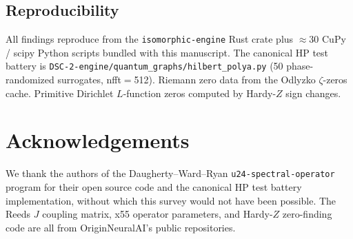 \documentclass[11pt,a4paper]{article}
\begin{document}
\subsection{Reproducibility}

All findings reproduce from the \texttt{isomorphic-engine} Rust crate
plus $\approx 30$ CuPy / scipy Python scripts bundled with this
manuscript. The canonical HP test battery is
\texttt{DSC-2-engine/quantum\_graphs/hilbert\_polya.py} (50
phase-randomized surrogates, nfft$=$512). Riemann zero data from the
Odlyzko $\zeta$-zeros cache. Primitive Dirichlet $L$-function zeros
computed by Hardy-$Z$ sign changes.

\section*{Acknowledgements}

We thank the authors of the Daugherty--Ward--Ryan
\texttt{u24-spectral-operator} program for their open source code and
the canonical HP test battery implementation, without which this survey
would not have been possible. The Reeds $J$ coupling matrix, x55
operator parameters, and Hardy-$Z$ zero-finding code are all from
OriginNeuralAI's public repositories.
\end{document}

